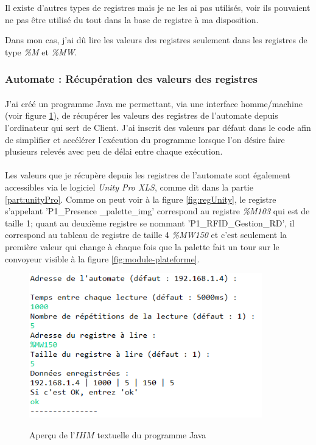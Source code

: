         Il existe d'autres types de registres mais je ne les ai pas utilisés, voir ils pouvaient ne pas être utilisé du tout dans la base de registre à ma disposition.
        
        Dans mon cas, j'ai dû lire les valeurs des registres seulement dans les registres de type \textit{\%M} et \textit{\%MW}.
    
    
    \subsubsection{Automate : Récupération des valeurs des registres}
    \label{part:readReg}
        \paragraph*{}
        J'ai créé un programme Java me permettant, via une interface homme/machine (voir figure \ref{fig:ihmJava}), de récupérer les valeurs des registres de l'automate depuis l'ordinateur qui sert de Client. J'ai inscrit des valeurs par défaut dans le code afin de simplifier et accélérer l'exécution du programme lorsque l'on désire faire plusieurs relevés avec peu de délai entre chaque exécution.
        
        \paragraph*{}
        Les valeurs que je récupère depuis les registres de l'automate sont également accessibles via le logiciel \textit{Unity Pro XLS}, comme dit dans la partie \ref{part:unityPro}. Comme on peut voir à la figure \ref{fig:regUnity}, le registre s'appelant 'P1\_Presence \_palette\_img' correspond au registre \textit{\%M103} qui est de taille 1; quant au deuxième registre se nommant 'P1\_RFID\_Gestion\_RD', il correspond au tableau de registre de taille 4 \textit{\%MW150} et c'est seulement la première valeur qui change à chaque fois que la palette fait un tour sur le convoyeur visible à la figure \ref{fig:module-plateforme}.
        
        \begin{figure}[H]
            \centering
            \begin{frame}{\includegraphics[width=0.9\textwidth]{image/ihmJava.png}}
            \end{frame}
            \caption{\label{fig:ihmJava}Aperçu de l'$IHM$  textuelle du programme Java}
        \end{figure}
        
